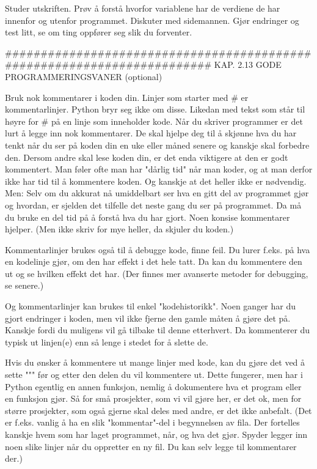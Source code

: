 Studer utskriften.
Prøv å forstå hvorfor variablene har de verdiene de har innenfor og utenfor programmet.
Diskuter med sidemannen. 
Gjør endringer og test litt, se om ting oppfører seg slik du forventer. 

######################################################################## 
KAP. 2.13  GODE PROGRAMMERINGSVANER  (optional)

Bruk nok kommentarer i koden din. 
Linjer som starter med # er kommentarlinjer. 
Python bryr seg ikke om disse. 
Likedan med tekst som står til høyre for # på en linje som inneholder kode.
Når du skriver programmer er det lurt å legge inn nok kommentarer.
De skal hjelpe deg til å skjønne hva du har tenkt når du ser på koden din
en uke eller måned senere og kanskje skal forbedre den.
Dersom andre skal lese koden din, er det enda viktigere at den er godt kommentert.
Man føler ofte man har "dårlig tid" når man koder,
og at man derfor ikke har tid til å kommentere koden.
Og kanskje at det heller ikke er nødvendig. 
Men: Selv om du akkurat nå umiddelbart ser hva en gitt del av programmet gjør og hvordan,
er sjelden det tilfelle det neste gang du ser på programmet.
Da må du bruke en del tid på å forstå hva du har gjort.
Noen konsise kommentarer hjelper.
(Men ikke skriv for mye heller, da skjuler du koden.) 

Kommentarlinjer brukes også til å debugge kode, finne feil.
Du lurer f.eks. på hva en kodelinje gjør, om den har effekt i det hele tatt.
Da kan du kommentere den ut og se hvilken effekt det har.
(Der finnes mer avanserte metoder for debugging, se senere.)

Og kommentarlinjer kan brukes til enkel "kodehistorikk". 
Noen ganger har du gjort endringer i koden, men vil ikke fjerne den gamle måten
å gjøre det på. Kanskje fordi du muligens vil gå tilbake til denne etterhvert.
Da kommenterer du typisk ut linjen(e) enn så lenge i stedet for å slette de. 


Hvis du ønsker å kommentere ut mange linjer med kode,
kan du gjøre det ved å sette """ før og etter den delen du vil kommentere ut.
Dette fungerer, men har i Python egentlig en annen funksjon, nemlig å dokumentere
hva et program eller en funksjon gjør.
Så for små prosjekter, som vi vil gjøre her, er det ok, men for større prosjekter, 
som også gjerne skal deles med andre, er det ikke anbefalt. 
(Det er f.eks. vanlig å ha en slik "kommentar"-del i begynnelsen av fila.
Der fortelles kanskje hvem som har laget programmet, når, og hva det gjør.
Spyder legger inn noen slike linjer når du oppretter en ny fil.
Du kan selv legge til kommentarer der.) 


